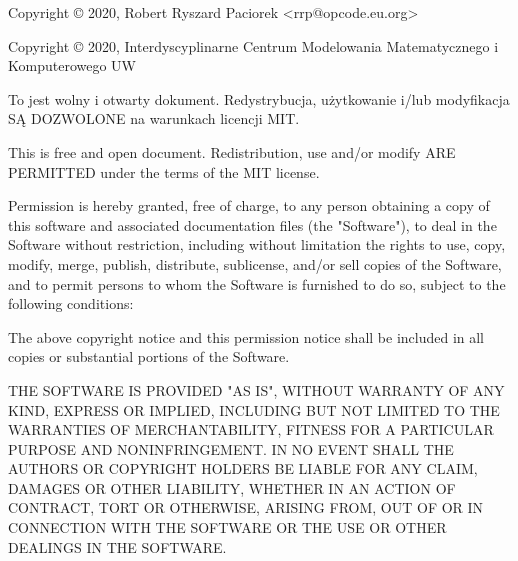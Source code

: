 \documentclass[aspectratio=169]{beamer} %
\begin{document}
\begin{frame}
\small
Copyright © 2020, Robert Ryszard Paciorek <rrp@opcode.eu.org>

Copyright © 2020, Interdyscyplinarne Centrum Modelowania Matematycznego i Komputerowego UW

\footnotesize\vspace{1.5em}
To jest wolny i otwarty dokument. Redystrybucja, użytkowanie i/lub modyfikacja SĄ DOZWOLONE na warunkach licencji MIT.

\vspace{1.5em}
This is free and open document. Redistribution, use and/or modify ARE PERMITTED under the terms of the MIT license.

\tiny\vspace{2em}
Permission is hereby granted, free of charge, to any person obtaining a copy
of this software and associated documentation files (the "Software"), to deal
in the Software without restriction, including without limitation the rights
to use, copy, modify, merge, publish, distribute, sublicense, and/or sell
copies of the Software, and to permit persons to whom the Software is
furnished to do so, subject to the following conditions:

\vspace{1em}
The above copyright notice and this permission notice shall be included in all
copies or substantial portions of the Software.

\vspace{1em}
THE SOFTWARE IS PROVIDED "AS IS", WITHOUT WARRANTY OF ANY KIND, EXPRESS OR
IMPLIED, INCLUDING BUT NOT LIMITED TO THE WARRANTIES OF MERCHANTABILITY,
FITNESS FOR A PARTICULAR PURPOSE AND NONINFRINGEMENT. IN NO EVENT SHALL THE
AUTHORS OR COPYRIGHT HOLDERS BE LIABLE FOR ANY CLAIM, DAMAGES OR OTHER
LIABILITY, WHETHER IN AN ACTION OF CONTRACT, TORT OR OTHERWISE, ARISING FROM,
OUT OF OR IN CONNECTION WITH THE SOFTWARE OR THE USE OR OTHER DEALINGS IN THE
SOFTWARE.

\end{frame}
\end{document}

